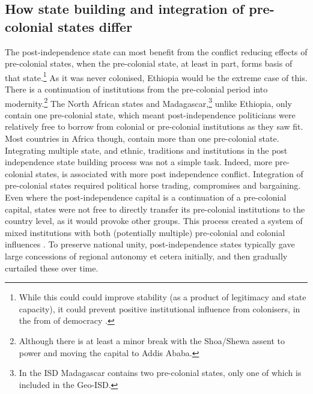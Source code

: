 \documentclass[12pt]{article}
\begin{document}
\subsection{How state building and integration of pre-colonial states differ} 
\label{How state building and integration of pre-colonial states differ}

The post-independence state can most benefit from the conflict reducing effects
of pre-colonial states, when the pre-colonial state, at least in part, forms
basis of that state.\footnote{While
	this could could improve stability (as a product of legitimacy and state
capacity), it could prevent positive institutional influence from colonisers, in
the from of democracy \citep{Hariri2012, Woodberry2012}.} As it was
never colonised, Ethiopia would be the extreme case of this. There is a
continuation of institutions from the pre-colonial period into
modernity.\footnote{Although there is at least a minor break with the Shoa/Shewa
assent to power and moving the capital to Addis Ababa.} The North African states
and Madagascar,\footnote{In the ISD Madagascar contains two pre-colonial states,
only one of which is included in the Geo-ISD.} unlike Ethiopia, only contain one
pre-colonial state, which meant post-independence politicians were relatively
free to borrow from colonial or pre-colonial institutions as they saw fit. Most
countries in Africa though, contain more than one pre-colonial state.
Integrating multiple state, and ethnic, traditions and institutions in the post
independence state building process was not a simple task. Indeed, more
pre-colonial states, is associated with more post independence conflict.
Integration of pre-colonial states required political horse
trading, compromises and bargaining. Even where the post-independence capital is
a continuation of a pre-colonial capital, states were not free to directly
transfer its pre-colonial institutions to the country level, as it would provoke
other groups. This process created a system of mixed institutions with both
(potentially multiple) pre-colonial and colonial influences
\citep{englebert2013inside}. To preserve national unity, post-independence states
typically gave large concessions of regional autonomy et cetera initially, and
then gradually curtailed these over time.
\end{document}

